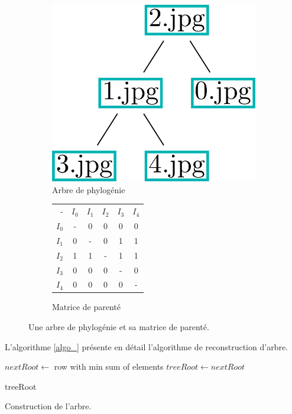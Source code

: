 \documentclass[utf8,final]{stageM2R} %
\begin{document}
\begin{figure}
  \begin{subfigure}{.5\textwidth}
    \centering
    \includegraphics[width=.5\linewidth]{images/algo_tree.png}
    \caption{Arbre de phylogénie}
    \label{algo_tree}
  \end{subfigure}%
  \begin{subfigure}{.5\textwidth}
    \centering
    \begin{tabular}{|r||c|c|c|c|c|}
      \hline
      - & $I_{0}$ & $I_{1}$ & $I_{2}$ & $I_{3}$ & $I_{4}$ \\ \hhline{|=::=|=|=|=|=|}
      $I_{0}$ & - & 0 & 0 & 0 & 0 \\ \hline
      $I_{1}$ & 0 & - & 0 & 1 & 1 \\ \hline
      $I_{2}$ & 1 & 1 & - & 1 & 1 \\ \hline
      $I_{3}$ & 0 & 0 & 0 & - & 0 \\ \hline
      $I_{4}$ & 0 & 0 & 0 & 0 & - \\ \hline
    \end{tabular} 
    \caption{Matrice de parenté}
    \label{parentage_matrix}
  \end{subfigure}
  \caption{Une arbre de phylogénie et sa matrice de parenté.}
  \label{parentage_tree}
\end{figure}

L'algorithme \ref{algo_} présente en détail l'algorithme de reconstruction d'arbre.

\begin{algorithm}[]
  \LinesNumbered
  \BlankLine
  $nextRoot \leftarrow$ row with min sum of elements\;
  $treeRoot \leftarrow nextRoot$\;
  \BlankLine

  \KwRet treeRoot
\caption{Construction de l'arbre.}
\label{algo_}
\end{algorithm}
\vspace{5mm}
\end{document}

